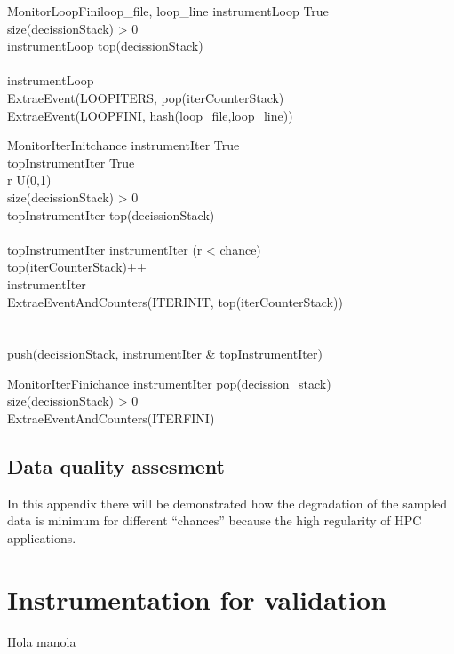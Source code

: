 \begin{pseudocode}{MonitorLoopFini}{loop_{file}, loop_{line}}
\label{pc:mercurium_monitor_loop_fini}
    instrumentLoop \GETS True\\
    \IF size(decissionStack) > 0 \THEN
    \BEGIN
      \\
      instrumentLoop \GETS top(decissionStack)\\
    \END\\
    \IF instrumentLoop \THEN
    \BEGIN
      \\
        ExtraeEvent(LOOPITERS, pop(iterCounterStack)\\
        ExtraeEvent(LOOPFINI, hash(loop_{file},loop_{line}))\\
    \END
\end{pseudocode}

\begin{pseudocode}{MonitorIterInit}{chance}
\label{pc:mercurium_monitor_iter_init}
    instrumentIter \GETS True\\
    topInstrumentIter \GETS True\\
    r \in U(0,1)\\
    \IF size(decissionStack) > 0 \THEN
    \BEGIN
      \\
      topInstrumentIter \GETS top(decissionStack)\\
    \END\\
    \IF topInstrumentIter \THEN
    \BEGIN
        instrumentIter \GETS (r < chance)\\
        top(iterCounterStack)++\\
        \IF instrumentIter \THEN
        \BEGIN
            \\
            ExtraeEventAndCounters(ITERINIT, top(iterCounterStack))\\
        \END\\
    \END\\
    push(decissionStack, instrumentIter \&  topInstrumentIter)\\
\end{pseudocode}

\begin{pseudocode}{MonitorIterFini}{chance}
\label{pc:mercurium_monitor_iter_fini}
    instrumentIter \GETS pop(decission_stack)\\
    \IF size(decissionStack) > 0 \THEN
    \BEGIN
      \\
      ExtraeEventAndCounters(ITERFINI)
    \END\\
\end{pseudocode}

\subsection{Data quality assesment}\label{ann:loops_data_quality}

In this appendix there will be demonstrated how the degradation of the sampled
data is minimum for different ``chances'' because the high regularity of HPC
applications.

\section{Instrumentation for validation}

Hola manola

